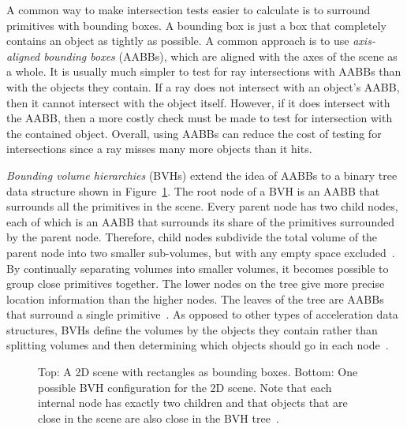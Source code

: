 \documentclass{sig-alternate}
\begin{document}
A common way to make intersection tests easier to calculate is to surround primitives with bounding boxes. A bounding box is just a box that completely contains an object as tightly as possible. A common approach is to use \emph{axis-aligned bounding boxes} (AABBs), which are aligned with the axes of the scene as a whole. It is usually much simpler to test for ray intersections with AABBs than with the objects they contain. If a ray does not intersect with an object's AABB, then it cannot intersect with the object itself. However, if it does intersect with the AABB, then a more costly check must be made to test for intersection with the contained object. Overall, using AABBs can reduce the cost of testing for intersections since a ray misses many more objects than it hits.



\emph{Bounding volume hierarchies} (BVHs) extend the idea of AABBs to a binary tree data structure shown in Figure~\ref{fig:BVH}. The root node of a BVH is an AABB that surrounds all the primitives in the scene. Every parent node has two child nodes, each of which is an AABB that surrounds its share of the primitives surrounded by the parent node. Therefore, child nodes subdivide the total volume of the parent node into two smaller sub-volumes, but with any empty space excluded~\cite{Wald:2007}. By continually separating volumes into smaller volumes, it becomes possible to group close primitives together. The lower nodes on the tree give more precise location information than the higher nodes. The leaves of the tree are AABBs that surround a single primitive~\cite{wiki:bvh}. As opposed to other types of acceleration data structures, BVHs define the volumes by the objects they contain rather than splitting volumes and then determining which objects should go in each node~\cite{Wald:2007}.

\begin{figure}[h]
\centering
{}
\caption{Top: A 2D scene with rectangles as bounding boxes. Bottom: One possible BVH configuration for the 2D scene. Note that each internal node has exactly two children and that objects that are close in the scene are also close in the BVH tree~\cite{wiki:bvh}.}
\label{fig:BVH}
\end{figure}
\end{document}
